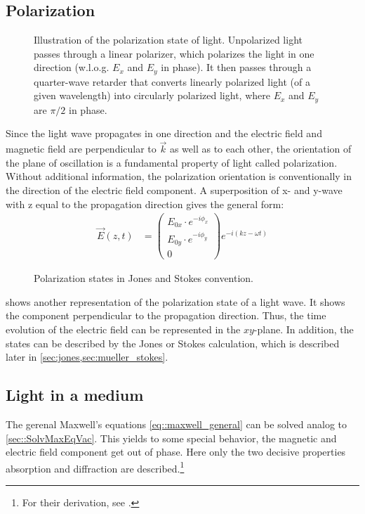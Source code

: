 \subsection{Polarization}
%
\begin{figure}[!t]
\centering
\setlength{\tikzwidth}{\textwidth}
\label{fig:polarization_state}
\caption{Illustration of the polarization state of light. Unpolarized light passes through a linear polarizer, which polarizes the light in one direction (w.l.o.g. $E_x$ and $E_y$ in phase). It then passes through a quarter-wave retarder that converts linearly polarized light (of a given wavelength) into circularly polarized light, where $E_x$ and $E_y$ are $\pi/2$ in phase.}
\end{figure}
%
Since the light wave propagates in one direction and the electric field and magnetic field are perpendicular to $\vec{k}$ as well as to each other, the orientation of the plane of oscillation is a fundamental property of light called polarization.
Without additional information, the polarization orientation is conventionally in the direction of the electric field component.
%
A superposition of x- and y-wave with z equal to the propagation direction gives the general form:
\begin{align}
\vec{E}(z,t) &= \begin{pmatrix} E_{0x} \cdot e^{ -i \phi_x } \\ E_{0y} \cdot e^{ -i \phi_y } \\ 0 \end{pmatrix}
e^{ -i (kz - \omega t)}
\end{align}
%
\begin{figure}[!t]
\centering
\tikzset{external/export=false}

\caption{Polarization states in Jones and Stokes convention.}
\label{fig:polarization_state_vectors}
\end{figure}
%
 shows another representation of the polarization state of a light wave.
It shows the component perpendicular to the propagation direction.
Thus, the time evolution of the electric field can be represented in the $xy$-plane.
In addition, the states can be described by the Jones or Stokes calculation, which is described later in \cref{sec:jones,sec:mueller_stokes}.
%
%
%
\subsection{Light in a medium}
%
The gerenal Maxwell's equations \cref{eq::maxwell_general} can be solved analog to \cref{sec::SolvMaxEqVac}. This yields to some special behavior, \eg{} the magnetic and electric field component get out of phase.
Here only the two decisive properties absorption and diffraction are described.\footnote{For their derivation, \eg{} see \cite{demtroeder2, Fliebach2012}.}
%
